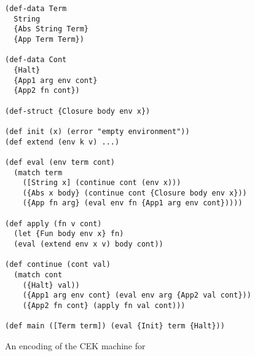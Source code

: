 \begin{figure}
\begin{lstlisting}
(def-data Term
  String
  {Abs String Term}
  {App Term Term})

(def-data Cont
  {Halt}
  {App1 arg env cont}
  {App2 fn cont})

(def-struct {Closure body env x})

(def init (x) (error "empty environment"))
(def extend (env k v) ...)

(def eval (env term cont)
  (match term
    ([String x] (continue cont (env x)))
    ({Abs x body} (continue cont {Closure body env x}))
    ({App fn arg} (eval env fn {App1 arg env cont}))))

(def apply (fn v cont)
  (let {Fun body env x} fn)
  (eval (extend env x v) body cont))

(def continue (cont val)
  (match cont
    ({Halt} val))
    ({App1 arg env cont} (eval env arg {App2 val cont}))
    ({App2 fn cont} (apply fn val cont)))

(def main ([Term term]) (eval {Init} term {Halt}))
\end{lstlisting}
\caption{An encoding of the CEK machine for \LC{}}
\label{fig:abstract-machine-cek}
\end{figure}